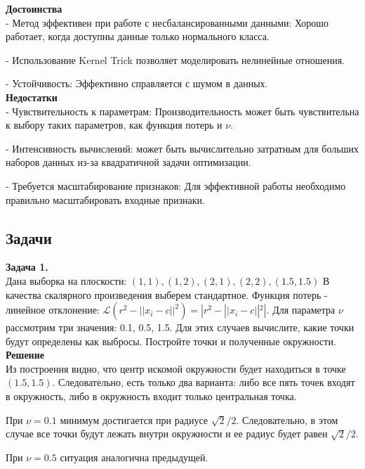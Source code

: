\textbf{Достоинства} \\

- Метод эффективен при работе с несбалансированными данными: Хорошо работает, когда доступны данные только нормального класса.

- Использование Kernel Trick позволяет моделировать нелинейные отношения.

- Устойчивость: Эффективно справляется с шумом в данных.\\

\textbf{Недостатки} \\

- Чувствительность к параметрам: Производительность может быть чувствительна к выбору таких параметров, как функция потерь и $\nu$.

- Интенсивность вычислений: может быть вычислительно затратным для больших наборов данных из-за квадратичной задачи оптимизации.

- Требуется масштабирование признаков: Для эффективной работы необходимо правильно масштабировать входные признаки.

\subsection{Задачи}

\textbf{Задача 1.} \\

Дана выборка на плоскости: $(1, 1), (1, 2), (2, 1), (2, 2), (1.5, 1.5)$
В качества скалярного произведения выберем стандартное. Функция потерь - линейное отклонение: $\mathcal{L} (r^2 - ||x_i - c||^2) = |r^2 - ||x_i - c||^2|$. Для параметра $\nu$ рассмотрим три значения: 0.1, 0.5, 1.5. Для этих случаев вычислите, какие точки будут определены как выбросы. Постройте точки и полученные окружности. \\

\textbf{Решение} \\

Из построения видно, что центр искомой окружности будет находиться в точке $(1.5, 1.5)$. Следовательно, есть только два варианта: либо все пять точек входят в окружность, либо в окружность входит только центральная точка.

При $\nu = 0.1$ минимум достигается при радиусе $\sqrt{2} / 2$. Следовательно, в этом случае все точки будут лежать внутри окружности и ее радиус будет равен $\sqrt{2} / 2$.

При $\nu = 0.5$ ситуация аналогична предыдущей.

